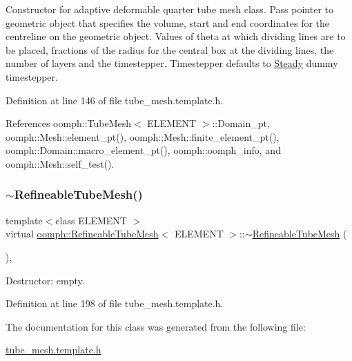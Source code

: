 Constructor for adaptive deformable quarter tube mesh class. Pass pointer to geometric object that specifies the volume, start and end coordinates for the centreline on the geometric object. Values of theta at which dividing lines are to be placed, fractions of the radius for the central box at the dividing lines, the number of layers and the timestepper. Timestepper defaults to \hyperlink{classoomph_1_1Steady}{Steady} dummy timestepper. 



Definition at line 146 of file tube\+\_\+mesh.\+template.\+h.



References oomph\+::\+Tube\+Mesh$<$ E\+L\+E\+M\+E\+N\+T $>$\+::\+Domain\+\_\+pt, oomph\+::\+Mesh\+::element\+\_\+pt(), oomph\+::\+Mesh\+::finite\+\_\+element\+\_\+pt(), oomph\+::\+Domain\+::macro\+\_\+element\+\_\+pt(), oomph\+::oomph\+\_\+info, and oomph\+::\+Mesh\+::self\+\_\+test().

\mbox{\label{classoomph_1_1RefineableTubeMesh_a743f3d17c3d5f0abe88ee1a7bda0b149}} 
\subsubsection{\texorpdfstring{$\sim$\+Refineable\+Tube\+Mesh()}{~RefineableTubeMesh()}}
{\footnotesize\ttfamily template$<$class E\+L\+E\+M\+E\+NT $>$ \\
virtual \hyperlink{classoomph_1_1RefineableTubeMesh}{oomph\+::\+Refineable\+Tube\+Mesh}$<$ E\+L\+E\+M\+E\+NT $>$\+::$\sim$\hyperlink{classoomph_1_1RefineableTubeMesh}{Refineable\+Tube\+Mesh} (\begin{DoxyParamCaption}{ }\end{DoxyParamCaption})\hspace{0.3cm}{\ttfamily [inline]}, {\ttfamily [virtual]}}



Destructor\+: empty. 



Definition at line 198 of file tube\+\_\+mesh.\+template.\+h.



The documentation for this class was generated from the following file\+:\begin{DoxyCompactItemize}
\item 
\hyperlink{tube__mesh_8template_8h}{tube\+\_\+mesh.\+template.\+h}\end{DoxyCompactItemize}
